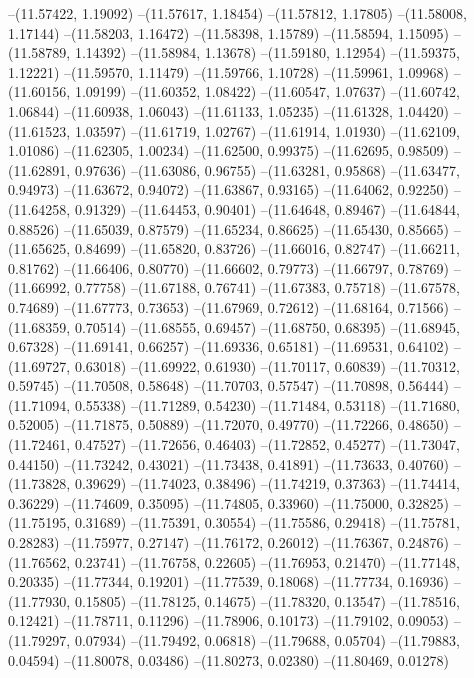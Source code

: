 --(11.57422, 1.19092)
--(11.57617, 1.18454)
--(11.57812, 1.17805)
--(11.58008, 1.17144)
--(11.58203, 1.16472)
--(11.58398, 1.15789)
--(11.58594, 1.15095)
--(11.58789, 1.14392)
--(11.58984, 1.13678)
--(11.59180, 1.12954)
--(11.59375, 1.12221)
--(11.59570, 1.11479)
--(11.59766, 1.10728)
--(11.59961, 1.09968)
--(11.60156, 1.09199)
--(11.60352, 1.08422)
--(11.60547, 1.07637)
--(11.60742, 1.06844)
--(11.60938, 1.06043)
--(11.61133, 1.05235)
--(11.61328, 1.04420)
--(11.61523, 1.03597)
--(11.61719, 1.02767)
--(11.61914, 1.01930)
--(11.62109, 1.01086)
--(11.62305, 1.00234)
--(11.62500, 0.99375)
--(11.62695, 0.98509)
--(11.62891, 0.97636)
--(11.63086, 0.96755)
--(11.63281, 0.95868)
--(11.63477, 0.94973)
--(11.63672, 0.94072)
--(11.63867, 0.93165)
--(11.64062, 0.92250)
--(11.64258, 0.91329)
--(11.64453, 0.90401)
--(11.64648, 0.89467)
--(11.64844, 0.88526)
--(11.65039, 0.87579)
--(11.65234, 0.86625)
--(11.65430, 0.85665)
--(11.65625, 0.84699)
--(11.65820, 0.83726)
--(11.66016, 0.82747)
--(11.66211, 0.81762)
--(11.66406, 0.80770)
--(11.66602, 0.79773)
--(11.66797, 0.78769)
--(11.66992, 0.77758)
--(11.67188, 0.76741)
--(11.67383, 0.75718)
--(11.67578, 0.74689)
--(11.67773, 0.73653)
--(11.67969, 0.72612)
--(11.68164, 0.71566)
--(11.68359, 0.70514)
--(11.68555, 0.69457)
--(11.68750, 0.68395)
--(11.68945, 0.67328)
--(11.69141, 0.66257)
--(11.69336, 0.65181)
--(11.69531, 0.64102)
--(11.69727, 0.63018)
--(11.69922, 0.61930)
--(11.70117, 0.60839)
--(11.70312, 0.59745)
--(11.70508, 0.58648)
--(11.70703, 0.57547)
--(11.70898, 0.56444)
--(11.71094, 0.55338)
--(11.71289, 0.54230)
--(11.71484, 0.53118)
--(11.71680, 0.52005)
--(11.71875, 0.50889)
--(11.72070, 0.49770)
--(11.72266, 0.48650)
--(11.72461, 0.47527)
--(11.72656, 0.46403)
--(11.72852, 0.45277)
--(11.73047, 0.44150)
--(11.73242, 0.43021)
--(11.73438, 0.41891)
--(11.73633, 0.40760)
--(11.73828, 0.39629)
--(11.74023, 0.38496)
--(11.74219, 0.37363)
--(11.74414, 0.36229)
--(11.74609, 0.35095)
--(11.74805, 0.33960)
--(11.75000, 0.32825)
--(11.75195, 0.31689)
--(11.75391, 0.30554)
--(11.75586, 0.29418)
--(11.75781, 0.28283)
--(11.75977, 0.27147)
--(11.76172, 0.26012)
--(11.76367, 0.24876)
--(11.76562, 0.23741)
--(11.76758, 0.22605)
--(11.76953, 0.21470)
--(11.77148, 0.20335)
--(11.77344, 0.19201)
--(11.77539, 0.18068)
--(11.77734, 0.16936)
--(11.77930, 0.15805)
--(11.78125, 0.14675)
--(11.78320, 0.13547)
--(11.78516, 0.12421)
--(11.78711, 0.11296)
--(11.78906, 0.10173)
--(11.79102, 0.09053)
--(11.79297, 0.07934)
--(11.79492, 0.06818)
--(11.79688, 0.05704)
--(11.79883, 0.04594)
--(11.80078, 0.03486)
--(11.80273, 0.02380)
--(11.80469, 0.01278)
